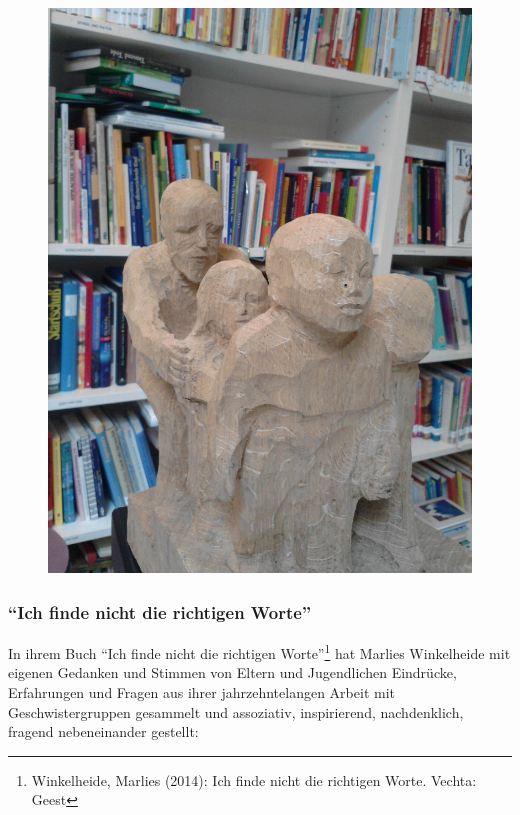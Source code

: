 \documentclass[a4paper,
fontsize=11pt,
oneside,
numbers=noperiodatend,
parskip=half-,
bibliography=totoc,
final
]{scrartcl}
\begin{document}
\begin{figure}
\centering
\includegraphics{img/abbildung1.jpg}
\end{figure}

\subsubsection{\texorpdfstring{\enquote{Ich finde nicht die richtigen
Worte}}{Ich finde nicht die richtigen Worte}}\label{ich-finde-nicht-die-richtigen-worte}

In ihrem Buch \enquote{Ich finde nicht die richtigen Worte}\footnote{Winkelheide,
  Marlies (2014): Ich finde nicht die richtigen Worte. Vechta: Geest}
hat Marlies Winkelheide mit eigenen Gedanken und Stimmen von Eltern und
Jugendlichen Eindrücke, Erfahrungen und Fragen aus ihrer
jahrzehntelangen Arbeit mit Geschwistergruppen gesammelt und assoziativ,
inspirierend, nachdenklich, fragend nebeneinander gestellt:
\end{document}
